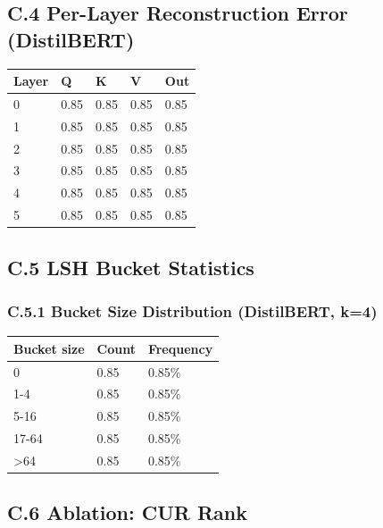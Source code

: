 \subsection{C.4 Per-Layer Reconstruction Error (DistilBERT)}

\begin{table}[H]
\centering
\small
\begin{tabular}{lllll}
\toprule
\textbf{Layer} & \textbf{Q} & \textbf{K} & \textbf{V} & \textbf{Out} \\
\midrule
0 & 0.85 & 0.85 & 0.85 & 0.85 \\
1 & 0.85 & 0.85 & 0.85 & 0.85 \\
2 & 0.85 & 0.85 & 0.85 & 0.85 \\
3 & 0.85 & 0.85 & 0.85 & 0.85 \\
4 & 0.85 & 0.85 & 0.85 & 0.85 \\
5 & 0.85 & 0.85 & 0.85 & 0.85 \\
\bottomrule
\end{tabular}
\end{table}

\subsection{C.5 LSH Bucket Statistics}

\subsubsection{C.5.1 Bucket Size Distribution (DistilBERT, k=4)}

\begin{table}[H]
\centering
\small
\begin{tabular}{lll}
\toprule
\textbf{Bucket size} & \textbf{Count} & \textbf{Frequency} \\
\midrule
0 & 0.85 & 0.85\% \\
1-4 & 0.85 & 0.85\% \\
5-16 & 0.85 & 0.85\% \\
17-64 & 0.85 & 0.85\% \\
>64 & 0.85 & 0.85\% \\
\bottomrule
\end{tabular}
\end{table}

\subsection{C.6 Ablation: CUR Rank}

